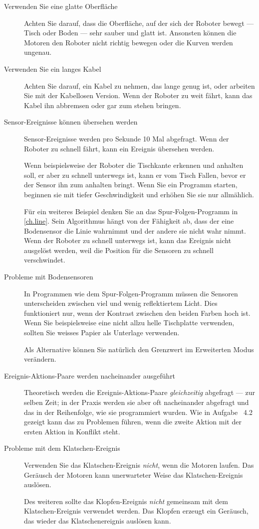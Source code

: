 \begin{description}

\item[Verwenden Sie eine glatte Oberfläche] Achten Sie darauf, dass die Oberfläche, auf der sich der Roboter bewegt --- Tisch oder Boden --- sehr sauber und glatt ist. Ansonsten können die Motoren den Roboter nicht richtig bewegen oder die Kurven werden ungenau. 

\item[Verwenden Sie ein langes Kabel] Achten Sie darauf, ein Kabel zu nehmen, das lange genug ist, oder arbeiten Sie mit der Kabellosen Version. Wenn der Roboter zu weit fährt, kann das Kabel ihn abbremsen oder gar zum stehen bringen. 

\item[Sensor-Ereignisse können übersehen werden] Sensor-Ereignisse werden pro Sekunde 10 Mal abgefragt. Wenn der Roboter zu schnell fährt, kann ein Ereignis übersehen werden.

Wenn beispielsweise der Roboter die Tischkante erkennen und anhalten soll, er aber zu schnell unterwegs ist, kann er vom Tisch Fallen, bevor er der Sensor ihn zum anhalten bringt. Wenn Sie ein Programm starten, beginnen sie mit tiefer Geschwindigkeit und erhöhen Sie sie nur allmählich. 

Für ein weiteres Beispiel denken Sie an das Spur-Folgen-Programm in \cref{ch.line}. Sein Algorithmus hängt von der Fähigkeit ab, dass der eine Bodensensor die Linie wahrnimmt und der andere sie nicht wahr nimmt. Wenn der Roboter zu schnell unterwegs ist, kann das Ereignis nicht ausgelöst werden, weil die Position für die Sensoren zu schnell verschwindet.  

\item[Probleme mit Bodensensoren] In Programmen wie dem Spur-Folgen-Programm müssen die Sensoren unterscheiden zwischen viel und wenig reflektiertem Licht. Dies funktioniert nur, wenn der Kontrast zwischen den beiden Farben hoch ist. Wenn Sie beispielsweise eine nicht allzu helle Tischplatte verwenden, sollten Sie weisses Papier als Unterlage verwenden. 

Als Alternative können Sie natürlich den Grenzwert im Erweiterten Modus verändern. 

\item[Ereignis-Aktions-Paare werden nacheinander ausgeführt] Theoretisch werden die Ereignis-Aktions-Paare \emph{gleichzeitig} abgefragt --- zur selben Zeit; in der Praxis werden sie aber oft nacheinander abgefragt und das in der Reihenfolge, wie sie programmiert wurden. Wie in Aufgabe ~4.2 gezeigt kann das zu Problemen führen, wenn die zweite Aktion mit der ersten Aktion in Konflikt steht. 

\item[Probleme mit dem Klatschen-Ereignis] Verwenden Sie das Klatschen-Ereignis  \emph{nicht}, wenn die Motoren laufen. Das Geräusch der Motoren kann unerwarteter Weise das Klatschen-Ereignis auslösen. 

Des weiteren sollte das Klopfen-Ereignis  \emph{nicht} gemeinsam mit dem Klatschen-Ereignis verwendet werden. Das Klopfen erzeugt ein Geräusch, das wieder das Klatschenereignis auslösen kann. 

\end{description}
